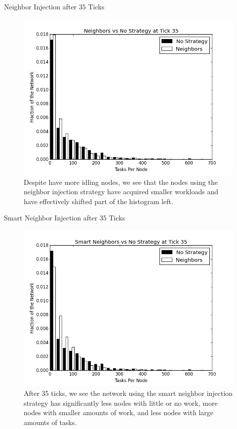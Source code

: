 \documentclass[11pt]{beamer}
\begin{document}
\begin{frame}{Neighbor Injection after 35 Ticks}
\begin{figure}
	\centering
	\includegraphics[width=0.7\linewidth]{figs/neighborsStableHist35}
	\caption[Neighbor injection  vs no strategy after 35 ticks.]{Despite have more idling nodes, we see that the nodes using the neighbor injection strategy have acquired smaller workloads and have effectively shifted part of the histogram left.}
	\label{fig:neighborsStableHist35}
\end{figure}

\end{frame}



\begin{frame}{Smart Neighbor Injection after 35 Ticks}
\begin{figure}
	\centering
	\includegraphics[width=0.7\linewidth]{figs/neighborsStableSmartHist35}
	\caption[Smart Neighbor injection  vs no strategy after 35 ticks.]{After 35 ticks, we see the network using the smart neighbor injection strategy has significantly less nodes with little or no work, more nodes with smaller amounts of work, and less nodes with large amounts of tasks.}
	\label{fig:neighborsStableSmartHist35}
\end{figure}
\end{frame}
\end{document}
